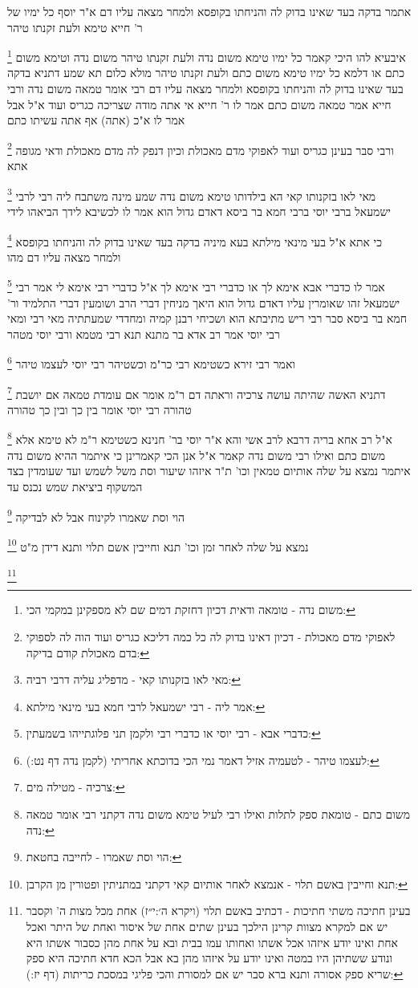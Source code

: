 \documentclass[12pt, openany]{book}
\newcommand{\footnotecomment}[1]{
	\renewcommand\thefootnote{}
	\footnote{#1}}
\newcommand{\commenta}[1]{\footnotecomment{#1}}
\begin{document}
{אתמר בדקה בעד שאינו בדוק לה והניחתו בקופסא ולמחר מצאה עליו דם א"ר יוסף כל ימיו של ר' חייא טימא ולעת זקנתו טיהר 
\commenta{משום נדה - טומאה ודאית דכיון דחזקת דמים שם לא מספקינן במקמי הכי:}
איבעיא להו היכי קאמר כל ימיו טימא משום נדה ולעת זקנתו טיהר משום נדה וטימא משום כתם 
או דלמא כל ימיו טימא משום כתם ולעת זקנתו טיהר מולא כלום 
תא שמע דתניא בדקה בעד שאינו בדוק לה והניחתו בקופסא ולמחר מצאה עליו דם רבי אומר טמאה משום נדה ורבי חייא אמר טמאה משום כתם
אמר לו ר' חייא אי אתה מודה שצריכה כגריס ועוד א"ל אבל אמר לו א"כ (אתה) אף אתה עשיתו כתם 
\commenta{לאפוקי מדם מאכולת - דכיון דאינו בדוק לה כל כמה דליכא כגריס ועוד הוה לה לספוקי בדם מאכולת קודם בדיקה:}
ורבי סבר בעינן כגריס ועוד לאפוקי מדם מאכולת וכיון דנפק לה מדם מאכולת ודאי מגופה אתא 
\commenta{מאי לאו בזקנותו קאי - מדפליג עליה דרבי רביה:}
מאי לאו בזקנותו קאי הא בילדותו טימא משום נדה שמע מינה 
משתבח ליה רבי לרבי ישמעאל ברבי יוסי ברבי חמא בר ביסא דאדם גדול הוא אמר לו לכשיבא לידך הביאהו לידי 
\commenta{אמר ליה - רבי ישמעאל לרבי חמא בעי מינאי מילתא:}
כי אתא א"ל בעי מינאי מילתא בעא מיניה בדקה בעד שאינו בדוק לה והניחתו בקופסא ולמחר מצאה עליו דם מהו 
\commenta{כדברי אבא - רבי יוסי או כדברי רבי ולקמן תני פלוגתייהו בשמעתין:}
אמר לו כדברי אבא אימא לך או כדברי רבי אימא לך א"ל כדברי רבי אימא לי 
אמר רבי ישמעאל זהו שאומרין עליו דאדם גדול הוא היאך מניחין דברי הרב ושומעין דברי התלמיד 
ור' חמא בר ביסא סבר רבי ריש מתיבתא הוא ושכיחי רבנן קמיה ומחדדי שמעתתיה 
מאי רבי ומאי רבי יוסי אמר רב אדא בר מתנא תנא רבי מטמא ורבי יוסי מטהר 
\commenta{לעצמו טיהר - לטעמיה אזיל דאמר נמי הכי בדוכתא אחריתי (לקמן נדה דף נט:):}
ואמר רבי זירא כשטימא רבי כר"מ וכשטיהר רבי יוסי לעצמו טיהר 
\commenta{צרכיה - מטילה מים:}
דתניא האשה שהיתה עושה צרכיה וראתה דם ר"מ אומר אם עומדת טמאה אם יושבת טהורה 
רבי יוסי אומר בין כך ובין כך טהורה 
\commenta{משום כתם - טומאת ספק לתלות ואילו רבי לעיל טימא משום נדה דקתני רבי אומר טמאה נדה:}
א"ל רב אחא בריה דרבא לרב אשי והא א"ר יוסי בר' חנינא כשטימא ר"מ לא טימא אלא משום כתם ואילו רבי משום נדה קאמר א"ל אנן הכי קאמרינן כי איתמר ההיא משום נדה איתמר
נמצא על שלה אותיום טמאין וכו' ת"ר איזהו שיעור וסת משל לשמש ועד שעומדין בצד המשקוף ביציאת שמש נכנס עד
\commenta{הוי וסת שאמרו - לחייבה בחטאת:}
הוי וסת שאמרו לקינוח אבל לא לבדיקה
\commenta{תנא וחייבין באשם תלוי - אנמצא לאחר אותיום קאי דקתני במתניתין ופטורין מן הקרבן:}
נמצא על שלה לאחר זמן וכו' תנא וחייבין אשם תלוי ותנא דידן מ"ט 
\commenta{בעינן חתיכה משתי חתיכות - דכתיב באשם תלוי (ויקרא ה׳:י״ז) אחת מכל מצות ה' וקסבר יש אם למקרא מצוות קרינן הילכך בעינן שתים אחת של איסור ואחת של היתר ואכל אחת ואינו יודע איזהו אכל אשתו ואחותו עמו בבית ובא על אחת מהן כסבור אשתו היא ונודע ששתיהן היו במטה ואינו יודע על איזהו מהן בא אבל הכא חדא חתיכה היא ספק שריא ספק אסורה ותנא ברא סבר יש אם למסורת והכי פליגי במסכת כריתות (דף יז:):}
}
\end{document}

